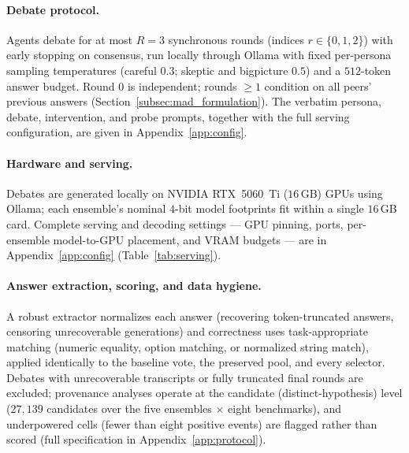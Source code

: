 \paragraph{Debate protocol.}
\label{par:debate_protocol}
Agents debate for at most $R=3$ synchronous rounds (indices $r\in\{0,1,2\}$) with early stopping on consensus, run locally through
Ollama with fixed per-persona sampling temperatures (careful $0.3$; skeptic and bigpicture $0.5$) and a
$512$-token answer budget. Round $0$ is independent; rounds $\ge 1$ condition on all peers' previous
answers (Section~\ref{subsec:mad_formulation}). The verbatim persona, debate, intervention, and probe prompts,
together with the full serving configuration, are given in Appendix~\ref{app:config}.

\paragraph{Hardware and serving.}
\label{par:hardware}
Debates are generated locally on NVIDIA RTX~5060~Ti ($16$\,GB) GPUs using Ollama; each ensemble's nominal
$4$-bit model footprints fit within a single $16$\,GB card. Complete serving and decoding settings --- GPU pinning, ports,
per-ensemble model-to-GPU placement, and VRAM budgets --- are in Appendix~\ref{app:config}
(Table~\ref{tab:serving}).

\paragraph{Answer extraction, scoring, and data hygiene.}
\label{par:answer_evaluation}
A robust extractor normalizes each answer (recovering token-truncated answers, censoring unrecoverable
generations) and correctness uses task-appropriate matching (numeric equality, option matching, or normalized
string match), applied identically to the baseline vote, the preserved pool, and every selector. Debates with
unrecoverable transcripts or fully truncated final rounds are excluded; provenance analyses operate at the
candidate (distinct-hypothesis) level ($27{,}139$ candidates over the five ensembles $\times$ eight
benchmarks), and underpowered cells (fewer than eight positive events) are flagged rather than scored (full
specification in Appendix~\ref{app:protocol}).

